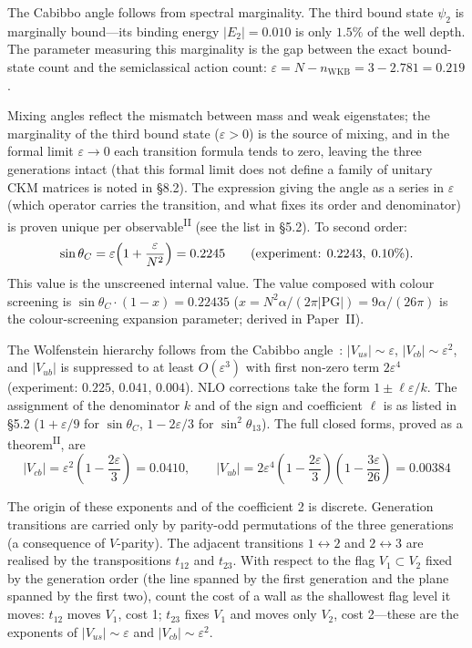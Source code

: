 \documentclass[12pt,a4paper]{article}
\newcommand{\PII}{\textsuperscript{\textup{II}}}
\begin{document}
The Cabibbo angle follows from spectral marginality.
The third bound state $\psi_2$ is marginally bound---its binding
energy $|E_2| = 0.010$ is only $1.5\%$ of the well depth.
The parameter measuring this marginality is the gap between the exact
bound-state count and the semiclassical action count:
$\varepsilon = N - n_\mathrm{WKB} = 3 - 2.781 = 0.219$.

Mixing angles reflect the mismatch between mass and weak
eigenstates; the marginality of the third bound state
($\varepsilon > 0$) is the source of mixing, and
in the formal limit $\varepsilon \to 0$ each transition formula
tends to zero, leaving the three generations intact (that this formal
limit does not define a family of unitary CKM matrices is noted in \S8.2).
The expression giving the angle as a series in $\varepsilon$ (which
operator carries the transition, and what fixes its order and
denominator) is proven unique per observable\PII{} (see the list in \S5.2).
To second order:
\begin{equation}\label{eq:cabibbo}
  \sin\theta_C = \varepsilon\Bigl(1 + \frac{\varepsilon}{N^2}\Bigr) = 0.2245   \qquad (\text{experiment: } 0.2243,\; 0.10\%).
\end{equation}
This value is the unscreened internal value. The value composed with colour screening is $\sin\theta_C \cdot (1-x) = 0.22435$ ($x = N^2\alpha/(2\pi|\mathrm{PG}|) = 9\alpha/(26\pi)$ is the colour-screening expansion parameter; derived in Paper~II).

The Wolfenstein hierarchy follows from the Cabibbo angle~\cite{wolfenstein}: $|V_{us}| \sim \varepsilon$, $|V_{cb}| \sim \varepsilon^2$, and $|V_{ub}|$ is suppressed to at least $O(\varepsilon^3)$ with first non-zero term $2\varepsilon^4$ (experiment: $0.225$, $0.041$, $0.004$).
NLO corrections take the form $1 \pm \ell\varepsilon/k$. The assignment
of the denominator $k$ and of the sign and coefficient $\ell$ is as
listed in \S5.2 ($1+\varepsilon/9$ for $\sin\theta_C$,
$1-2\varepsilon/3$ for $\sin^2\!\theta_{13}$).
The full closed forms, proved as a theorem\PII{}, are
\begin{equation}
|V_{cb}| = \varepsilon^2\left(1-\frac{2\varepsilon}{3}\right) = 0.0410,\qquad
|V_{ub}| = 2\varepsilon^4\left(1-\frac{2\varepsilon}{3}\right)\left(1-\frac{3\varepsilon}{26}\right) = 0.00384
\end{equation}

The origin of these exponents and of the coefficient 2 is discrete. Generation transitions are carried only by parity-odd permutations of the three generations (a consequence of $V$-parity). The adjacent transitions $1\leftrightarrow2$ and $2\leftrightarrow3$ are realised by the transpositions $t_{12}$ and $t_{23}$. With respect to the flag $V_1 \subset V_2$ fixed by the generation order (the line spanned by the first generation and the plane spanned by the first two), count the cost of a wall as the shallowest flag level it moves: $t_{12}$ moves $V_1$, cost 1; $t_{23}$ fixes $V_1$ and moves only $V_2$, cost 2---these are the exponents of $|V_{us}| \sim \varepsilon$ and $|V_{cb}| \sim \varepsilon^2$.
\end{document}
